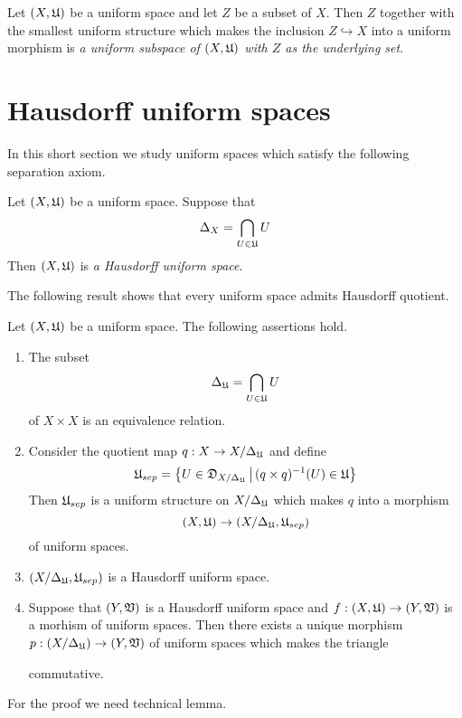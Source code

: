 \begin{definition}
Let $(X,{\mathfrak U})$ be a uniform space and let $Z$ be a subset of $X$. Then $Z$ together with the smallest uniform structure which makes the inclusion $Z\hookrightarrow X$ into a uniform morphism is \textit{a uniform subspace of $(X,{\mathfrak U})$ with $Z$ as the underlying set}.
\end{definition}

\section{Hausdorff uniform spaces}
\noindent
In this short section we study uniform spaces which satisfy the following separation axiom. 

\begin{definition}
Let $(X,{\mathfrak U})$ be a uniform space. Suppose that
$$\Delta_X = \bigcap_{U\in {\mathfrak U}}U$$
Then $(X,{\mathfrak U})$ is \textit{a Hausdorff uniform space}.
\end{definition}
\noindent
The following result shows that every uniform space admits Hausdorff quotient.

\begin{theorem}\label{theorem:universal_Hausdorff_quotient}
Let $(X,{\mathfrak U})$ be a uniform space. The following assertions hold.
\begin{enumerate}[label=\emph{\textbf{(\arabic*)}}, leftmargin=*]
\item The subset
$$\Delta_{{\mathfrak U}} = \bigcap_{U\in {\mathfrak U}}U$$
of $X\times X$ is an equivalence relation.
\item Consider the quotient map $q:X\rightarrow X/\Delta_{{\mathfrak U}}$ and define 
$${\mathfrak U}_{sep} = \big\{U \in {\mathfrak D}_{X/\Delta_{{\mathfrak U}}}\,\big|\,(q\times q)^{-1}(U) \in {\mathfrak U}\big\}$$
Then ${\mathfrak U}_{sep}$ is a uniform structure on $X/\Delta_{{\mathfrak U}}$ which makes $q$ into a morphism 
$$\left(X,{\mathfrak U}\right)\rightarrow \left(X/\Delta_{{\mathfrak U}},{\mathfrak U}_{sep}\right)$$
of uniform spaces.
\item $\left(X/\Delta_{{\mathfrak U}}, {\mathfrak U}_{sep}\right)$ is a Hausdorff uniform space.
\item Suppose that $\left(Y,{\mathfrak V}\right)$ is a Hausdorff uniform space and $f:\left(X,{\mathfrak U}\right)\rightarrow \left(Y,{\mathfrak V}\right)$ is a morhism of uniform spaces. Then there exists a unique morphism $p:\left(X/\Delta_{{\mathfrak U}}\right)\rightarrow \left(Y,{\mathfrak V}\right)$ of uniform spaces which makes the triangle
\begin{center}
\end{center}
commutative.
\end{enumerate}
\end{theorem}
\noindent
For the proof we need technical lemma.

